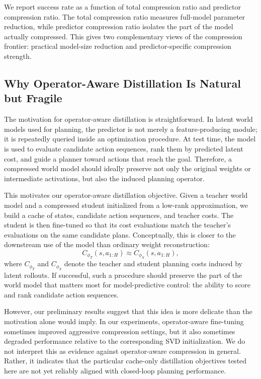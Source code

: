 \documentclass[11pt]{article}
\begin{document}
We report success rate as a function of total compression ratio and predictor compression ratio. The total compression ratio measures full-model parameter reduction, while predictor compression ratio isolates the part of the model actually compressed. This gives two complementary views of the compression frontier: practical model-size reduction and predictor-specific compression strength.

\subsection{Why Operator-Aware Distillation Is Natural but Fragile}
\label{sec:operator_distillation_fragility}

The motivation for operator-aware distillation is straightforward. In latent world models used for planning, the predictor is not merely a feature-producing module; it is repeatedly queried inside an optimization procedure. At test time, the model is used to evaluate candidate action sequences, rank them by predicted latent cost, and guide a planner toward actions that reach the goal. Therefore, a compressed world model should ideally preserve not only the original weights or intermediate activations, but also the induced planning operator.

This motivates our operator-aware distillation objective. Given a teacher world model and a compressed student initialized from a low-rank approximation, we build a cache of states, candidate action sequences, and teacher costs. The student is then fine-tuned so that its cost evaluations match the teacher's evaluations on the same candidate plans. Conceptually, this is closer to the downstream use of the model than ordinary weight reconstruction:
\[
    C_{\phi_T}(s,a_{1:H})
    \approx
    C_{\phi_S}(s,a_{1:H}),
\]
where \(C_{\phi_T}\) and \(C_{\phi_S}\) denote the teacher and student planning costs induced by latent rollouts. If successful, such a procedure should preserve the part of the world model that matters most for model-predictive control: the ability to score and rank candidate action sequences.

However, our preliminary results suggest that this idea is more delicate than the motivation alone would imply. In our experiments, operator-aware fine-tuning sometimes improved aggressive compression settings, but it also sometimes degraded performance relative to the corresponding SVD initialization. We do not interpret this as evidence against operator-aware compression in general. Rather, it indicates that the particular cache-only distillation objectives tested here are not yet reliably aligned with closed-loop planning performance.
\end{document}
